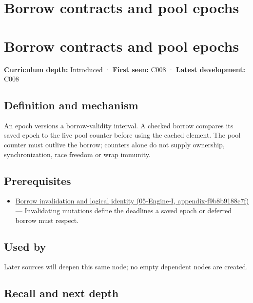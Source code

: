 \hypertarget{appendix-aa405b7c3903}{}
\section*{Borrow contracts and pool epochs}
\section{Borrow contracts and pool epochs}\label{appendix-aa405b7c3903-borrow-contracts-and-pool-epochs}

\textbf{Curriculum depth:} Introduced · \textbf{First seen:} C008 · \textbf{Latest development:} C008

\subsection{Definition and mechanism}\label{appendix-aa405b7c3903-definition-and-mechanism}

An epoch versions a borrow-validity interval. A checked borrow compares its saved epoch to the live pool counter before using the cached element. The pool counter must outlive the borrow; counters alone do not supply ownership, synchronization, race freedom or wrap immunity.

\subsection{Prerequisites}\label{appendix-aa405b7c3903-prerequisites}

\begin{itemize}
\tightlist
\item
  \href{../05-Engine-I/main.pdf\#nameddest=appendix-f9b8b9188c7f}{Borrow invalidation and logical identity (05-Engine-I, appendix-f9b8b9188c7f)} --- Invalidating mutations define the deadlines a saved epoch or deferred borrow must respect.
\end{itemize}

\subsection{Used by}\label{appendix-aa405b7c3903-used-by}

Later sources will deepen this same node; no empty dependent nodes are created.

\subsection{Recall and next depth}\label{appendix-aa405b7c3903-recall-and-next-depth}

